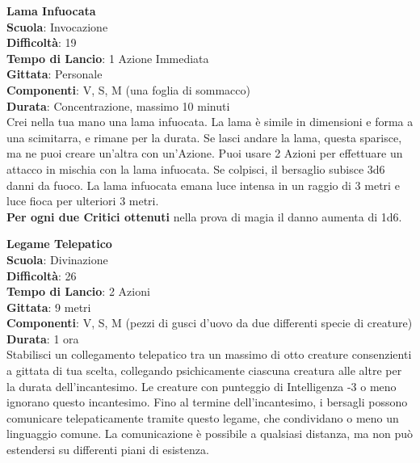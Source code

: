 \begin{multicols}{2}
\medskip\textbf{Lama Infuocata}\\
\textbf{Scuola}: Invocazione\\
\textbf{Difficoltà}: 19\\
\textbf{Tempo di Lancio}: 1 Azione Immediata\\
\textbf{Gittata}: Personale\\
\textbf{Componenti}: V, S, M (una foglia di sommacco)\\
\textbf{Durata}: Concentrazione, massimo 10 minuti \\
Crei nella tua mano una lama infuocata. La lama è simile in dimensioni e forma a una scimitarra, e rimane per la durata. Se lasci andare la lama, questa sparisce, ma ne puoi creare un'altra con un'Azione. Puoi usare 2 Azioni per effettuare un attacco in mischia con la lama infuocata. Se colpisci, il bersaglio subisce 3d6 danni da fuoco. La lama infuocata emana luce intensa in un raggio di 3 metri e luce fioca per ulteriori 3 metri.\\
\textbf{Per ogni due Critici ottenuti} nella prova di magia il danno aumenta di 1d6.

\medskip\textbf{Legame Telepatico}\\
\textbf{Scuola}: Divinazione\\
\textbf{Difficoltà}: 26\\
\textbf{Tempo di Lancio}: 2 Azioni\\
\textbf{Gittata}: 9 metri\\
\textbf{Componenti}: V, S, M (pezzi di gusci d'uovo da due differenti specie di creature)\\
\textbf{Durata}: 1 ora\\
Stabilisci un collegamento telepatico tra un massimo di otto creature consenzienti a gittata di tua scelta, collegando psichicamente ciascuna creatura alle altre per la durata dell'incantesimo. Le creature con punteggio di Intelligenza -3 o meno ignorano questo incantesimo. Fino al termine dell'incantesimo, i bersagli possono comunicare telepaticamente tramite questo legame, che condividano o meno un linguaggio comune. La comunicazione è possibile a qualsiasi distanza, ma non può estendersi su differenti piani di esistenza.


\end{multicols}
